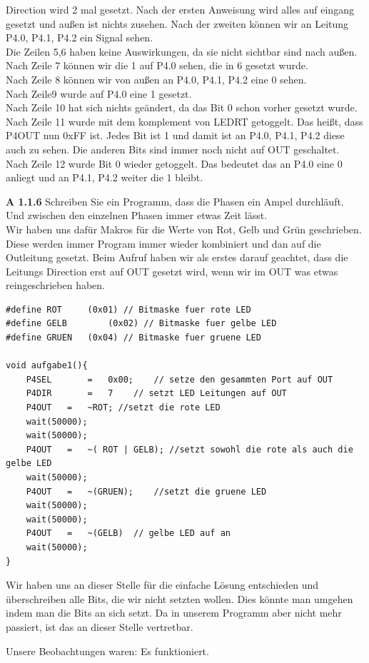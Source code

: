 \begin{description}
Direction wird 2 mal gesetzt. Nach der ersten Anweisung wird alles auf eingang gesetzt und außen ist nichts zusehen. Nach der zweiten können wir an Leitung P4.0, P4.1, P4.2 ein Signal sehen.\\
Die Zeilen 5,6 haben keine Auswirkungen, da sie nicht sichtbar sind nach außen.\\
Nach Zeile 7 können wir die 1 auf P4.0 sehen, die in 6 gesetzt wurde.\\
Nach Zeile 8 können wir von außen an P4.0, P4.1, P4.2 eine 0 sehen.\\
Nach Zeile9 wurde auf P4.0 eine 1 gesetzt.\\
Nach Zeile 10 hat sich nichts geändert, da das Bit 0 schon vorher gesetzt wurde.\\
Nach Zeile 11 wurde mit dem komplement von LEDRT getoggelt. Das heißt, dass P4OUT nun 0xFF ist. Jedes Bit ist 1 und damit ist an P4.0, P4.1, P4.2 diese auch zu sehen. Die anderen Bits sind immer noch nicht auf OUT geschaltet.\\
Nach Zeile 12 wurde Bit 0 wieder getoggelt. Das bedeutet das an P4.0 eine 0 anliegt und an P4.1, P4.2  weiter die 1 bleibt.

\pagebreak

\item{\bfseries A 1.1.6} Schreiben Sie ein Programm, dass die Phasen ein Ampel durchläuft. Und zwischen den einzelnen Phasen immer etwas Zeit lässt.\\
Wir haben uns dafür Makros für die Werte von Rot, Gelb und Grün geschrieben. Diese werden immer Program immer wieder kombiniert und dan auf die Outleitung gesetzt. Beim Aufruf haben wir als erstes darauf geachtet, dass die Leitungs Direction erst auf OUT gesetzt wird, wenn wir im OUT was etwas reingeschrieben haben.

\begin{lstlisting}
#define	ROT		(0x01) // Bitmaske fuer rote LED
#define	GELB		(0x02) // Bitmaske fuer gelbe LED
#define	GRUEN	(0x04) // Bitmaske fuer gruene LED

void aufgabe1(){
	P4SEL		=	0x00;	 // setze den gesammten Port auf OUT
	P4DIR		=	7	 // setzt LED Leitungen auf OUT
	P4OUT	=	~ROT; //setzt die rote LED
	wait(50000);
	wait(50000);
	P4OUT	=	~( ROT | GELB); //setzt sowohl die rote als auch die gelbe LED
	wait(50000);
	P4OUT	= 	~(GRUEN);	 //setzt die gruene LED
	wait(50000);
	wait(50000);
	P4OUT	=	~(GELB)	 // gelbe LED auf an
	wait(50000);
}
\end{lstlisting}

Wir haben uns an dieser Stelle für die einfache Lösung entschieden und überschreiben alle Bits, die wir nicht setzten wollen. Dies könnte man umgehen indem man die Bits an sich setzt. Da in unserem Programm aber nicht mehr passiert, ist das an dieser Stelle vertretbar.

Unsere Beobachtungen waren: Es funktioniert.

\end{description}